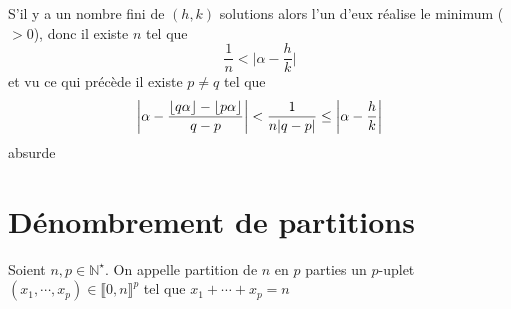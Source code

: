 S'il y a un nombre fini de $(h, k)$ solutions alors l'un d'eux réalise le minimum ($>0$), donc il existe $n$ tel que \[
    \frac1n<\Big|\alpha-\frac hk\Big|
\]
et vu ce qui précède il existe $p\neq q$ tel que \[
    \left| \alpha-\frac{\left\lfloor q\alpha\right\rfloor-\left\lfloor p\alpha\right\rfloor}{q-p} \right|<\frac1{n|q-p|}\leq \left| \alpha-\frac hk \right|
\]
absurde

\section{Dénombrement de partitions}

Soient $n, p\in\mathbb N^\star$. On appelle partition de $n$ en $p$ parties un $p$-uplet $(x_1, \cdots, x_p)\in\llbracket 0, n\rrbracket ^p$ tel que $x_1+\cdots +x_p=n$
